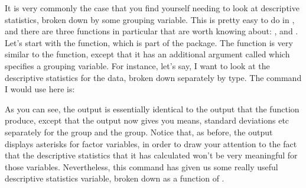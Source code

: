 It is very commonly the case that you find yourself needing to look at descriptive statistics, broken down by some grouping variable. This is pretty easy to do in \R, and there are three functions in particular that are worth knowing about: ,  and . Let's start with the  function, which is part of the  package. The  function is very similar to the  function, except that it has an additional argument called  which specifies a grouping variable. For instance, let's  say, I want to look at the descriptive statistics for the  data, broken down separately by  type. The command I would use here is:
As you can see, the output is essentially identical to the output that the  function produce, except that the output now gives you means, standard deviations etc separately for the  group and the  group. Notice that, as before, the output displays asterisks for factor variables, in order to draw your attention to the fact that the descriptive statistics that it has calculated won't be very meaningful for those variables. Nevertheless, this command has given us some really useful descriptive statistics  variable, broken down as a function of .

